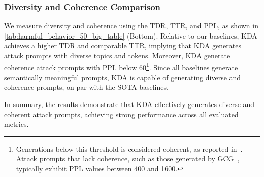 \subsubsection{Diversity and Coherence Comparison} We measure diversity and coherence using the TDR, TTR, and PPL, as shown in \autoref{tab:harmful_behavior_50_big_table} (Bottom). Relative to our baselines, KDA achieves a higher TDR and comparable TTR, implying that KDA generates attack prompts with diverse topics and tokens. Moreover, KDA generate coherence attack prompts with PPL below 60\footnote{Generations below this threshold is considered coherent, as reported in~\citet{liu_autodan_2024}. Attack prompts that lack coherence, such as those generated by GCG~\citep{zou_universal_2023}, typically exhibit PPL values between 400 and 1600.}. Since all baselines generate semantically meaningful prompts, KDA is capable of generating diverse and coherence prompts, on par with the SOTA baselines.

In summary, the results demonstrate that KDA effectively generates diverse and coherent attack prompts, achieving strong performance across all evaluated metrics.













